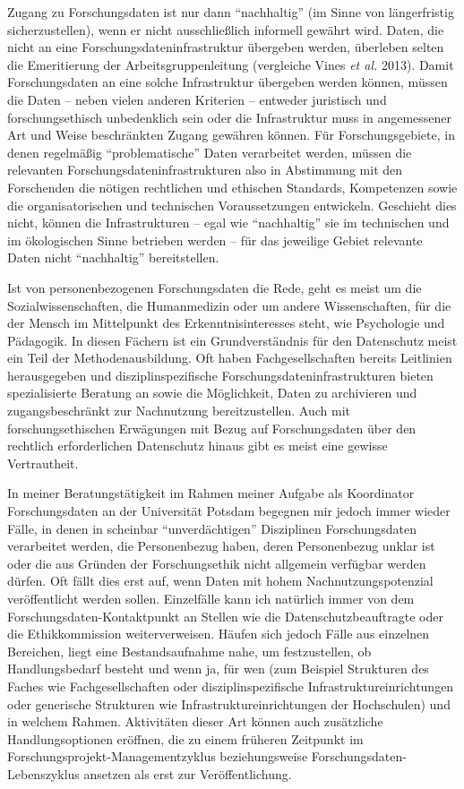 \documentclass[a4paper,
fontsize=11pt,
oneside,
numbers=noperiodatend,
parskip=half-,
bibliography=totoc,
final
]{scrartcl}
\begin{document}
Zugang zu Forschungsdaten ist nur dann \enquote{nachhaltig} (im Sinne
von längerfristig sicherzustellen), wenn er nicht ausschließlich
informell gewährt wird. Daten, die nicht an eine
Forschungsdateninfrastruktur übergeben werden, überleben selten die
Emeritierung der Arbeitsgruppenleitung (vergleiche Vines \emph{et al.}
2013). Damit Forschungsdaten an eine solche Infrastruktur übergeben
werden können, müssen die Daten -- neben vielen anderen Kriterien --
entweder juristisch und forschungsethisch unbedenklich sein oder die
Infrastruktur muss in angemessener Art und Weise beschränkten Zugang
gewähren können. Für Forschungsgebiete, in denen regelmäßig
\enquote{problematische} Daten verarbeitet werden, müssen die relevanten
Forschungsdateninfrastrukturen also in Abstimmung mit den Forschenden
die nötigen rechtlichen und ethischen Standards, Kompetenzen sowie die
organisatorischen und technischen Voraussetzungen entwickeln. Geschieht
dies nicht, können die Infrastrukturen -- egal wie \enquote{nachhaltig}
sie im technischen und im ökologischen Sinne betrieben werden -- für das
jeweilige Gebiet relevante Daten nicht \enquote{nachhaltig}
bereitstellen.

Ist von personenbezogenen Forschungsdaten die Rede, geht es meist um die
Sozialwissenschaften, die Humanmedizin oder um andere Wissenschaften,
für die der Mensch im Mittelpunkt des Erkenntnisinteresses steht, wie
Psychologie und Pädagogik. In diesen Fächern ist ein Grundverständnis
für den Datenschutz meist ein Teil der Methodenausbildung. Oft haben
Fachgesellschaften bereits Leitlinien herausgegeben und
disziplinspezifische Forschungsdateninfrastrukturen bieten
spezialisierte Beratung an sowie die Möglichkeit, Daten zu archivieren
und zugangsbeschränkt zur Nachnutzung bereitzustellen. Auch mit
forschungsethischen Erwägungen mit Bezug auf Forschungsdaten über den
rechtlich erforderlichen Datenschutz hinaus gibt es meist eine gewisse
Vertrautheit.

In meiner Beratungstätigkeit im Rahmen meiner Aufgabe als Koordinator
Forschungsdaten an der Universität Potsdam begegnen mir jedoch immer
wieder Fälle, in denen in scheinbar \enquote{unverdächtigen} Disziplinen
Forschungsdaten verarbeitet werden, die Personenbezug haben, deren
Personenbezug unklar ist oder die aus Gründen der Forschungsethik nicht
allgemein verfügbar werden dürfen. Oft fällt dies erst auf, wenn Daten
mit hohem Nachnutzungspotenzial veröffentlicht werden sollen.
Einzelfälle kann ich natürlich immer von dem
Forschungsdaten-Kontaktpunkt an Stellen wie die Datenschutzbeauftragte
oder die Ethikkommission weiterverweisen. Häufen sich jedoch Fälle aus
einzelnen Bereichen, liegt eine Bestandsaufnahme nahe, um festzustellen,
ob Handlungsbedarf besteht und wenn ja, für wen (zum Beispiel Strukturen
des Faches wie Fachgesellschaften oder disziplinspezifische
Infrastruktureinrichtungen oder generische Strukturen wie
Infrastruktureinrichtungen der Hochschulen) und in welchem Rahmen.
Aktivitäten dieser Art können auch zusätzliche Handlungsoptionen
eröffnen, die zu einem früheren Zeitpunkt im
Forschungsprojekt-Managementzyklus beziehungsweise
Forschungsdaten-Lebenszyklus ansetzen als erst zur Veröffentlichung.
\end{document}
